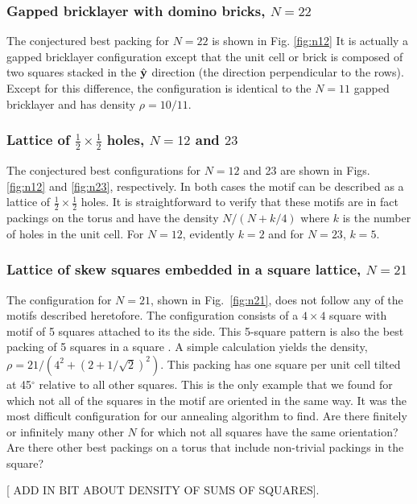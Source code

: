 \subsubsection{Gapped bricklayer with domino bricks, $N=22$}
The conjectured best packing for $N=22$ is shown in Fig. \ref{fig:n12} It is actually a gapped bricklayer configuration except that the unit cell or brick is composed of two squares stacked in the $\hat{{\bf y}}$ direction (the direction perpendicular to the rows).  Except for this difference, the configuration is identical to the $N=11$ gapped bricklayer and has density $\rho= 10/11$.

\subsubsection{Lattice of $\frac{1}{2}\times\frac{1}{2}$ holes, $N=12$ and $23$}
The conjectured best configurations for $N=12$ and 23 are shown in Figs. \ref{fig:n12} and \ref{fig:n23}, respectively.  In both cases the motif can be described as a lattice of $\frac{1}{2}\times\frac{1}{2}$ holes. It is straightforward to verify that these motifs are in fact packings on the torus and have the density $N/(N+k/4)$ where $k$ is the number of holes in the unit cell.  For $N=12$, evidently $k=2$ and for $N=23$, $k=5$. 


\subsubsection{Lattice of skew squares embedded in a square lattice, $N=21$}
The configuration for  $N=21$, shown in Fig.\ \ref{fig:n21}, does not follow any of the motifs described heretofore. The configuration consists of a $4 \times 4$ square with motif of 5 squares attached to its the side.  This 5-square pattern is also the best packing of 5 squares in a square \cite{Friedman2002}.  A simple calculation yields the density, $\rho= 21/(4^2+(2+1/\sqrt{2})^2)$.  This packing has one square per unit cell tilted at 45$^{\circ}$ relative to all other squares.  This is the only example that we found for which not all of the squares in the motif are oriented in the same way. It was the most difficult configuration for our annealing algorithm to find.  Are there finitely or infinitely many other $N$ for which not all squares have the same orientation? Are there other best packings on a torus that include non-trivial packings in the square?

[ ADD IN BIT ABOUT DENSITY OF SUMS OF SQUARES].

